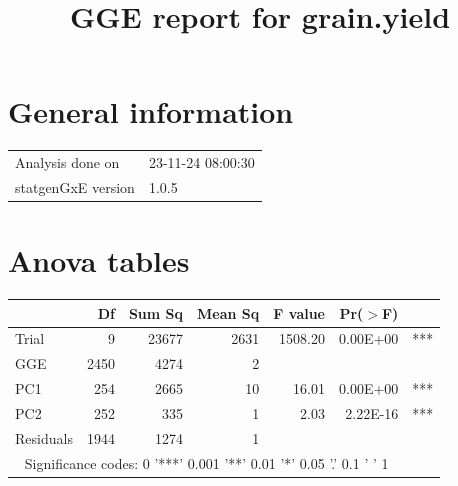 \documentclass[a4paper,11pt]{article}\usepackage[]{graphicx}\usepackage[]{xcolor}
\title{GGE report for grain.yield}%
\author{\vspace{-5ex}}
\date{\vspace{-5ex}}
\begin{document}
\maketitle
\singlespacing

\section{General information}

\begin{table}[ht]
\begin{flushleft}
\begin{tabular}{ll}
  Analysis done on & 23-11-24 08:00:30 \\ 
  statgenGxE version & 1.0.5 \\ 
  \end{tabular}
\label{general}
\end{flushleft}
\end{table}


\section{Anova tables}

\begin{table}[ht]
\begin{flushleft}
\label{anova}
\begin{tabular}{lrrrrrl}
  \hline
 & Df & Sum Sq & Mean Sq & F value & Pr($>$F) &  \\ 
  \hline
Trial & 9 & 23677 & 2631 & 1508.20 & 0.00E+00 & *** \\ 
  GGE & 2450 & 4274 & 2 &  &  &  \\ 
  PC1 & 254 & 2665 & 10 & 16.01 & 0.00E+00 & *** \\ 
  PC2 & 252 & 335 & 1 & 2.03 & 2.22E-16 & *** \\ 
  Residuals & 1944 & 1274 & 1 &  &  &  \\ 
   \hline  \multicolumn{6}{c}{Significance codes: 0 '***' 0.001 '**' 0.01 '*' 0.05 '.' 0.1 ' ' 1 } \\ \hline
\end{tabular}
\end{flushleft}
\end{table}
\end{document}
